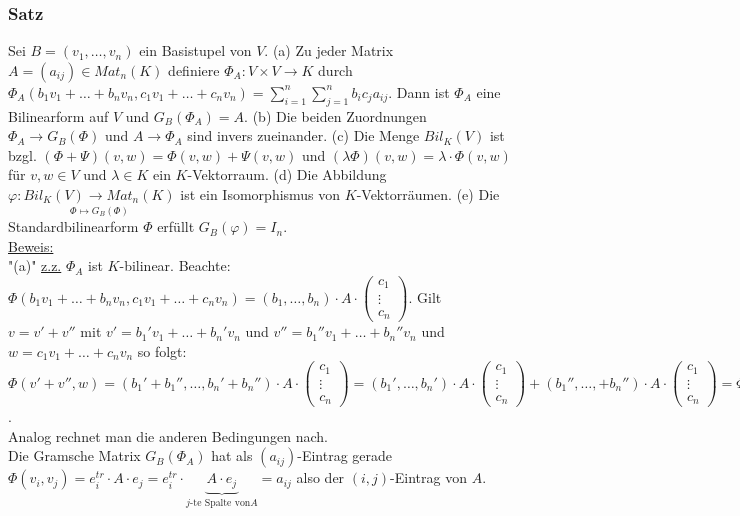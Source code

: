 \documentclass[a4paper]{article}
\newcommand{\ul}{\underline}
\renewcommand{\proof}{\ul{Beweis:}\\}
\let\phi\varphi
\begin{document}
\subsubsection{Satz}
Sei \(B=(v_1,\dots,v_n)\) ein Basistupel von \(V\).
(a) Zu jeder Matrix \(A=(a_{ij})\in Mat_n(K)\) definiere \(\Phi_A:V\times V\rightarrow K\) durch \(\Phi_A(b_1v_1+\dots+b_nv_n,c_1v_1+\dots+c_nv_n)=\sum_{i=1}^{n}\sum_{j=1}^{n}b_ic_ja_{ij}\). Dann ist \(\Phi_A\) eine Bilinearform auf \(V\) und \(G_B(\Phi_A)=A\).
(b) Die beiden Zuordnungen \(\Phi_A\rightarrow G_B(\Phi)\) und \(A\rightarrow \Phi_A\) sind invers zueinander.
(c) Die Menge \(Bil_K(V)\) ist bzgl. \((\Phi+\Psi)(v,w)=\Phi(v,w)+\Psi(v,w)\) und \((\lambda\Phi)(v,w)=\lambda\cdot\Phi(v,w)\) für \(v,w\in V\) und \(\lambda\in K\) ein \(K\)-Vektorraum.
(d) Die Abbildung \(\phi:\underset{\Phi\mapsto G_B(\Phi)}{Bil_K(V)\rightarrow Mat_n(K)}\) ist ein Isomorphismus von \(K\)-Vektorräumen.
(e) Die Standardbilinearform \(\Phi\) erfüllt \(G_B(\phi)=I_n\).\\
\proof
"(a)" \ul{z.z.} \(\Phi_A\) ist \(K\)-bilinear. Beachte: \(\Phi(b_1v_1+\dots+b_nv_n, c_1v_1+\dots+c_nv_n)=(b_1,\dots,b_n)\cdot A\cdot \begin{pmatrix}
c_1\\
\vdots\\
c_n
\end{pmatrix}\).
Gilt \(v=v'+v''\) mit \(v'=b_1'v_1+\dots+b_n'v_n\) und \(v''=b_1''v_1+\dots+b_n''v_n\) und \(w=c_1v_1+\dots+c_nv_n\) so folgt:
\(\Phi(v'+v'',w)=(b_1'+b_1'',\dots,b_n'+b_n'')\cdot A \cdot \begin{pmatrix}
c_1\\
\vdots\\
c_n
\end{pmatrix}=(b_1',\dots,b_n')\cdot A \cdot \begin{pmatrix}
c_1\\
\vdots\\
c_n
\end{pmatrix}+(b_1'',\dots,+b_n'')\cdot A \cdot \begin{pmatrix}
c_1\\
\vdots\\
c_n
\end{pmatrix}=\Phi(v',w)+\Phi(v'',w)\).\\
Analog rechnet man die anderen Bedingungen nach.\\
Die Gramsche Matrix \(G_B(\Phi_A)\) hat als \((a_{ij})\)-Eintrag gerade \(\Phi(v_i,v_j)=e_i^{tr}\cdot A \cdot e_j=e_i^{tr}\cdot \underbrace{A\cdot e_j}_{j\text{-te Spalte von} A}=a_{ij}\) also der \((i,j)\)-Eintrag von \(A\).\\
\end{document}
